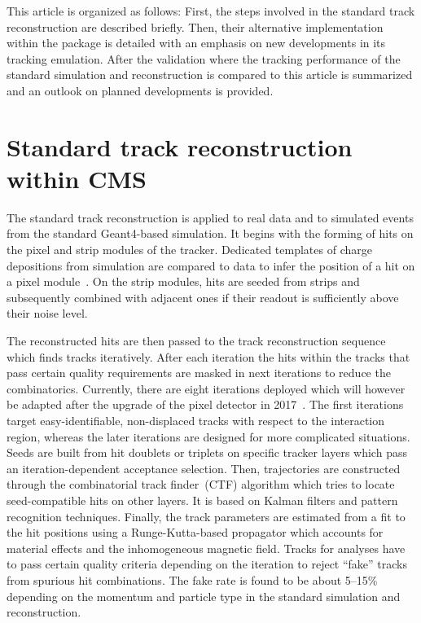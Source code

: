 This article is organized as follows: First, the steps involved in the standard track reconstruction are described briefly. Then, their alternative implementation within the \FSIM package is detailed with an emphasis on new developments in its tracking emulation. After the validation where the tracking performance of the standard simulation and reconstruction is compared to \FSIM this article is summarized and an outlook on planned developments is provided.







\section{Standard track reconstruction within CMS}


The standard track reconstruction is applied to real data and to simulated events from the standard Geant4-based simulation. It begins with the forming of hits on the pixel and strip modules of the tracker. Dedicated templates of charge depositions from simulation are compared to data to infer the position of a hit on a pixel module~\cite{Swartz:2007zz}. On the strip modules, hits are seeded from strips and subsequently combined with adjacent ones if their readout is sufficiently above their noise level.

The reconstructed hits are then passed to the track reconstruction sequence which finds tracks iteratively. After each iteration the hits within the tracks that pass certain quality requirements are masked in next iterations to reduce the combinatorics. Currently, there are eight iterations deployed which will however be adapted after the upgrade of the pixel detector in 2017~\cite{Dominguez:1481838}. The first iterations target easy-identifiable, non-displaced tracks with respect to the interaction region, whereas the later iterations are designed for more complicated situations. Seeds are built from hit doublets or triplets on specific tracker layers which pass an iteration-dependent acceptance selection. Then, trajectories are constructed through the combinatorial track finder~(CTF) algorithm which tries to locate seed-compatible hits on other layers. It is based on Kalman filters and pattern recognition techniques.  Finally, the track parameters are estimated from a fit to the hit positions using a Runge-Kutta-based propagator which accounts for material effects and the inhomogeneous magnetic field. Tracks for analyses have to pass certain quality criteria depending on the iteration to reject ``fake'' tracks from spurious hit combinations. The fake rate is found to be about 5--15\% depending on the momentum and particle type in the standard simulation and reconstruction.

